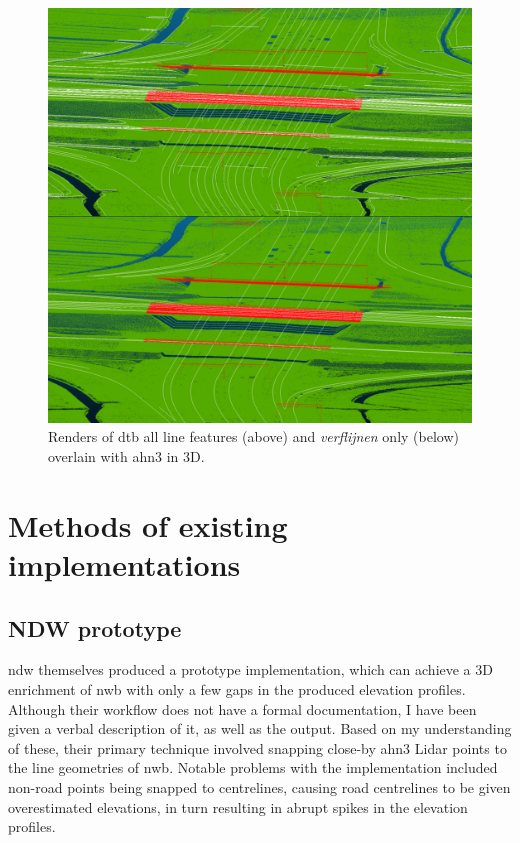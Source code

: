 \begin{figure}
    \centering
    \includegraphics[width=\linewidth]{final_report/figs/ahn_sample_10.png} 
    \caption{Renders of \ac{dtb} all line features (above) and \textit{verflijnen} only (below) overlain with \ac{ahn3} in 3D.}
    \label{fig:dtbahn}
\end{figure}

\section{Methods of existing implementations}
\label{sec:methodsexisting}

\subsection{NDW prototype}
\label{sub:ndwprototype}

\ac{ndw} themselves produced a prototype implementation, which can achieve a 3D enrichment of \ac{nwb} with only a few gaps in the produced elevation profiles. Although their workflow does not have a formal documentation, I have been given a verbal description of it, as well as the output. Based on my understanding of these, their primary technique involved snapping close-by \ac{ahn3} Lidar points to the line geometries of \ac{nwb}. Notable problems with the implementation included non-road points being snapped to centrelines, causing road centrelines to be given overestimated elevations, in turn resulting in abrupt spikes in the elevation profiles.

